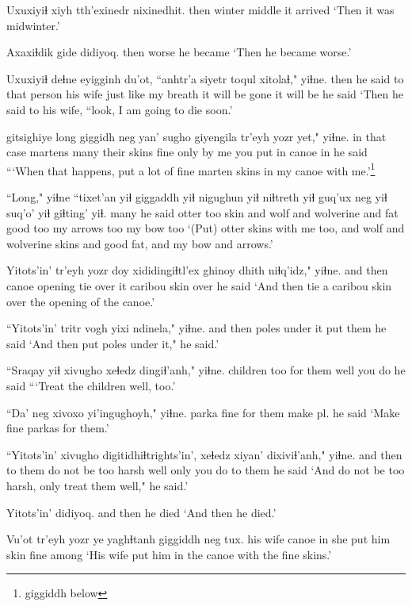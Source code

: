 \documentclass[12pt]{article}
\begin{document}
\gll Uxuxiyiɬ xiyh tth'exinedr nixinedhit.  
then  winter middle {it arrived} 
\glt `Then it was midwinter.'
\glend 

\gll Axaxiɬdik gide didiyoq. 
then  worse {he became}
\glt  `Then he became worse.'
\glend

\gll Uxuxiyiɬ deɬne  eyigginh du'ot, ``anhtr'a siyetr  toqul xitolaɬ," yiɬne.
then  {he said to} {that person} {his wife} {just like} {my breath} {it will be gone} {it will be} {he said}
\glt `Then he said to his wife, ``look, I am going to die soon.'
\glend 

 gitsighiye long giggidh neg yan' sugho giyengila {tr'eyh yozr} yet," yiɬne.
{in that case} martens many {their skins} fine only {by me} {you put in} canoe in {he said}
\glt ```When that happens, put a lot of fine marten skins in my canoe with me.'\footnote{giggiddh below}
\glend 

\gll ``Long," yiɬne ``tixet'an yiɬ giggaddh yiɬ nigughun yiɬ  niɬtreth yiɬ guq'ux neg yiɬ suq'o'  yiɬ giɬting' yiɬ.
many {he said} otter  too skin and wolf  and wolverine and fat  good too {my arrows} too {my bow} too
\glt `(Put) otter skins with me too, and wolf and wolverine skins and good fat, and my bow and arrows.'
\glend 

\gll Yitots'in' {tr'eyh yozr} doy  xididingiɬtl'ex ghinoy dhith niɬq'idz," yiɬne.
{and then} canoe opening {tie over it} caribou  skin over {he said}
\glt `And then tie a caribou skin over the opening of the canoe.'
\glend 

\gll ``Yitots'in' tritr {vogh yixi} ndinela," yiɬne.
{and then} poles {under it} {put them} {he said}
\glt `And then put poles under it," he said.'
\glend 

\gll ``Sraqay yiɬ xivugho xeɬedz dingiɬ'anh," yiɬne.
children too {for them} well {you do} {he said}
\glt ```Treat the children well, too.'
\glend 

\gll ``Da'  neg xivoxo yi'ingughoyh," yiɬne.
parka fine {for them} {make pl.} {he said}
\glt `Make fine parkas for them.'
\glend 

\gll ``Yitots'in' xivugho digitidhiɬtrights'in',  xeɬedz xiyan' dixiviɬ'anh," yiɬne.
{and then} {to them} {do not be too harsh} well  only {you do to them}  {he said}
\glt `And do not be too harsh, only treat them well," he said.'
\glend 

\gll Yitots'in' didiyoq.
{and then} {he died}
\glt `And then he died.'
\glend 

\gll Vu'ot  {tr'eyh yozr} ye yaghɬtanh giggiddh neg tux.
{his wife} canoe  in {she put him} skin  fine among
\glt `His wife put him in the canoe with the fine skins.'
\glend 
\end{document}
